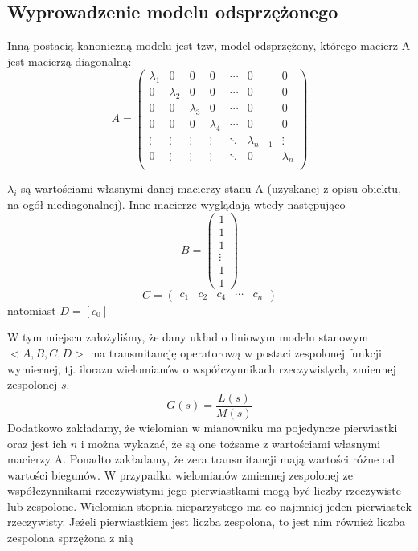 \documentclass{article}
\begin{document}
		\subsection{Wyprowadzenie modelu odsprzężonego}
			Inną postacią kanoniczną modelu jest tzw, model odsprzężony, którego macierz A jest
			macierzą diagonalną:
			\begin{equation}
				A=\begin{pmatrix}
				  \lambda_1    &   0    &   0    &   0    & \cdots &   0    &   0      \\
				  0    &   \lambda_2    &   0    &   0    & \cdots &   0    &   0      \\
				  0    &   0    &   \lambda_3    &   0    & \cdots &   0    &   0      \\
				  0    &   0    &   0    &    \lambda_4   & \cdots &   0    &   0      \\
					\vdots & \vdots & \vdots & \vdots & \ddots & \lambda_{n-1} & \vdots   \\
				  0    & \vdots & \vdots & \vdots & \ddots &   0    & \lambda_n\\
				\end{pmatrix}
			\end{equation}

			$\lambda_i$ są wartościami własnymi danej macierzy stanu A (uzyskanej z opisu obiektu, na ogół niediagonalnej).
			Inne macierze wyglądają wtedy następująco	
			\begin{equation}
				B = 
				\begin{pmatrix}
					1 \\
					1 \\
					1 \\
					\vdots \\
					1 \\
					1 
				\end{pmatrix}
			\end{equation}
			\begin{equation}
				C = 
				\begin{pmatrix}
					c_1 & c_2 & c_4 & \cdots & c_n
				\end{pmatrix}
			\end{equation}
			natomiast $D = [c_0]$

			W tym miejscu założyliśmy, że dany układ o liniowym modelu stanowym $<A,B,C,D>$ ma
			transmitancję operatorową w postaci zespolonej funkcji wymiernej, tj. ilorazu
			wielomianów o współczynnikach rzeczywistych, zmiennej zespolonej $s$.
			\begin{equation}
				G(s) = \frac{L(s)}{M(s)}
			\end{equation}
			Dodatkowo zakładamy, że wielomian w mianowniku ma pojedyncze pierwiastki 
			oraz jest ich $n$ i można wykazać,
			że są one tożsame z wartościami własnymi macierzy A. Ponadto zakładamy, że zera
			transmitancji mają wartości różne od wartości biegunów.
			W przypadku wielomianów zmiennej zespolonej ze współczynnikami rzeczywistymi jego
			pierwiastkami mogą być liczby rzeczywiste lub zespolone. Wielomian stopnia
			nieparzystego ma co najmniej jeden pierwiastek rzeczywisty. Jeżeli pierwiastkiem jest
			liczba zespolona, to jest nim również liczba zespolona sprzężona z nią
\end{document}
